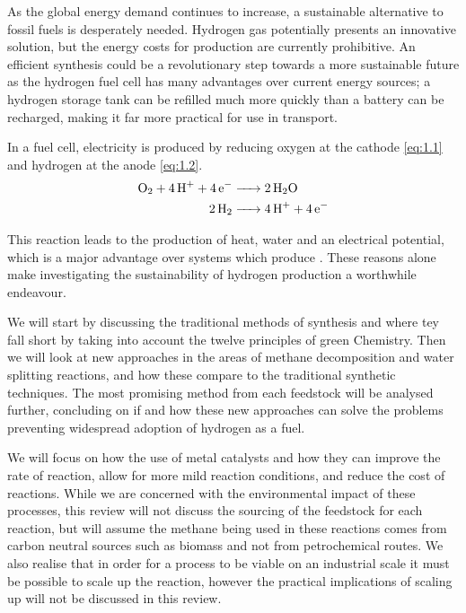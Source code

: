 As the global energy demand continues to increase, a sustainable alternative to fossil fuels is desperately needed.
Hydrogen gas potentially presents an innovative solution, but the energy costs for production are currently prohibitive.
An efficient synthesis could be a revolutionary step towards a more sustainable future as the hydrogen fuel cell has many advantages over current energy sources; a hydrogen storage tank can be refilled much more quickly than a battery can be recharged\cite{Offer2010}, making it far more practical for use in transport.

In a fuel cell, electricity is produced by reducing oxygen at the cathode \eqref{eq:1.1} and hydrogen at the anode \eqref{eq:1.2}.
\begin{align}
	\ce{O_2 + 4H+ + 4e- &-> 2H2O}	\label{eq:1.1}\\
	\ce{2H2 &-> 4H+ + 4e-} 		\label{eq:1.2}
\end{align}

This reaction leads to the production of heat, water and an electrical potential\cite{6278114}, which is a major advantage over systems which produce .
These reasons alone make investigating the sustainability of hydrogen production a worthwhile endeavour.

We will start by discussing the traditional methods of synthesis and where tey fall short by taking into account the twelve principles of green Chemistry\cite{Saxena2011}.
Then we will look at new approaches in the areas of methane decomposition and water splitting reactions, and how these compare to the traditional synthetic techniques.
The most promising method from each feedstock will be analysed further, concluding on if and how these new approaches can solve the problems preventing widespread adoption of hydrogen as a fuel.

We will focus on how the use of metal catalysts and how they can improve the rate of reaction, allow for more mild reaction conditions, and reduce the cost of reactions.
While we are concerned with the environmental impact of these processes, this review will not discuss the sourcing of the feedstock for each reaction, but will assume the methane being used in these reactions comes from carbon neutral sources such as biomass\cite{Probstein1982} and not from petrochemical routes.
We also realise that in order for a process to be viable on an industrial scale it must be possible to scale up the reaction, however the practical implications of scaling up will not be discussed in this review.
